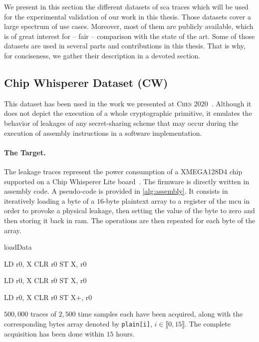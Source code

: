 We present in this section the different datasets of \gls{sca} traces which will be used for the experimental validation of our work in this thesis.
Those datasets cover a large spectrum of use cases.
Moreover, most of them are publicly available, which is of great interest for -- fair -- comparison with the state of the art.
Some of those datasets are used in several parts and contributions in this thesis.
That is why, for conciseness, we gather their description in a devoted section.

\subsection{Chip Whisperer Dataset (CW)}
\label{sec:dataset_cw}
This dataset has been used in the work we presented at \textsc{Ches} 2020~\cite{masure_comprehensive_2019}.
Although it does not depict the execution of a whole cryptographic primitive, it emulates the behavior of leakages of any secret-sharing scheme that may occur during the execution of assembly instructions in a software implementation.

\paragraph{The Target.}
The leakage traces represent the power consumption of a \textsf{XMEGA128D4} chip supported on a \textsf{Chip Whisperer Lite} board~\cite{oflynn_chip_2014}.
The firmware is directly written in assembly code.
A pseudo-code is provided in \autoref{alg:assembly}.
It consists in iteratively loading a byte of a \(16\)-byte plaintext array to a register of the \gls{mcu} in order to provoke a physical leakage, then setting the value of the byte to zero and then storing it back in \gls{ram}.
The operations are then repeated for each byte of the array.

\begin{algorithm}[ht]
    \caption{\textsf{loadData}}\label{alg:assembly}
    \begin{algorithmic}[1]
        \State LD   r0, X   
        \State CLR  r0      
        \State ST   X, r0   

        \State LD   r0, X   
        \State CLR  r0
        \State ST   X, r0

        \State LD   r0, X   
        \State CLR  r0
        \State ST   X+, r0
    \end{algorithmic}
\end{algorithm}
\(500,000\) traces of \(2,500\) time samples each have been acquired, along with the corresponding bytes array denoted by \verb+plain[i]+, \(i \in \llbracket 0, 15 \rrbracket\). 
The complete acquisition has been done within \(15\) hours. 

